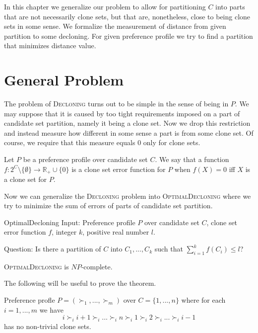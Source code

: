 In this chapter we generalize our problem to allow for partitioning $C$ into parts
that are not necessarily clone sets, but that are, nonetheless, close to being clone sets in some sense.
We formalize the measurement of distance from given partition to some decloning.
For given preference profile we try to find a partition that minimizes distance value.

\section{General Problem}

The problem of \textsc{Decloning} turns out to be simple in the sense of being in $P$.
We may suppose that it is caused by too tight requirements imposed on a part of candidate set partition,
namely it being a clone set.
Now we drop this restriction and instead measure how different in some sense a part is from some clone set.
Of course, we require that this measure equals $0$ only for clone sets.

\begin{defn}
Let $P$ be a preference profile over candidate set $C$.
We say that a function
$f: 2^C \setminus \{\emptyset\} \rightarrow \mathbb{R}_+\cup\{0\}$
is a clone set error function for $P$ when $f(X) = 0$ iff $X$ is a clone set for $P$.
\end{defn}

Now we can generalize the \textsc{Decloning} problem into \textsc{OptimalDecloning}
where we try to minimize the sum of errors of parts of candidate set partition.

\begin{problem}{OptimalDecloning}
	Input: Preference profile $P$ over candidate set $C$, clone set error function $f$,
		integer $k$, positive real number $l$.

	Question: Is there a partition of $C$ into $C_1, ..., C_k$ such that $\sum_{i=1}^k f(C_i) \leq l$?
\end{problem}

\begin{thm} \label{optdecl}
	\textsc{OptimalDecloning} is $NP$-complete.
\end{thm}

The following will be useful to prove the theorem.

\begin{lmm} \label{lmmnotrivial}
	Preference profle $P = (\succ_1, ... , \succ_m)$ over $C = \{1, ..., n\}$
	where for each $i=1,...,m$ we have
	$$i \succ_i i+1 \succ_i ... \succ_i n \succ_i 1 \succ_i 2 \succ_i ... \succ_i i-1$$
	has no non-trivial clone sets.
\end{lmm}

